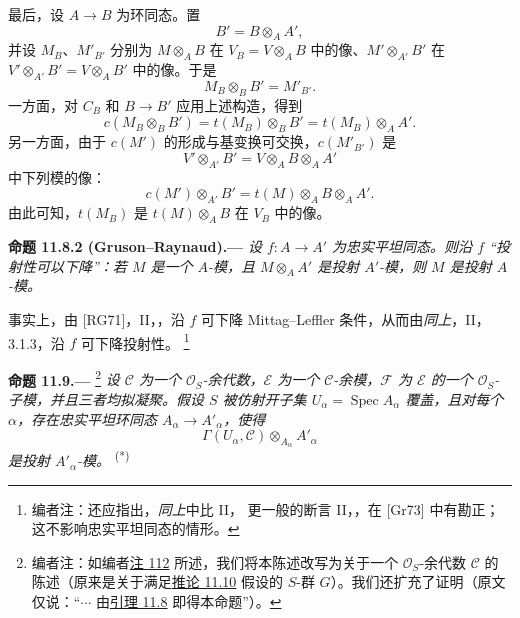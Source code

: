最后，设 \(A\to B\) 为环同态。置
\[
  B'=B\otimes_AA',
\]
并设 \(M_B\)、\(M'_{B'}\) 分别为 \(M\otimes_AB\) 在 \(V_B=V\otimes_AB\) 中的像、\(M'\otimes_{A'}B'\) 在 \(V'\otimes_{A'}B'=V\otimes_AB'\) 中的像。于是
\[
  M_B\otimes_BB'=M'_{B'}.
\]
一方面，对 \(C_B\) 和 \(B\to B'\) 应用上述构造，得到
\label{form:sga3-VIB-11.8.1-base-change-first}%
\[
  c(M_B\otimes_BB')
    =t(M_B)\otimes_BB'
    =t(M_B)\otimes_AA'.
\]
另一方面，由于 \(c(M')\) 的形成与基变换可交换，\(c(M'_{B'})\) 是
\[
  V'\otimes_{A'}B'=V\otimes_AB\otimes_AA'
\]
中下列模的像：
\label{form:sga3-VIB-11.8.1-base-change-second}%
\[
  c(M')\otimes_{A'}B'
    =t(M)\otimes_AB\otimes_AA'.
\]
由此可知，\(t(M_B)\) 是 \(t(M)\otimes_AB\) 在 \(V_B\) 中的像。

\medskip
{}\label{prop:sga3-VIB-11.8.2}%
\noindent\textbf{命题 11.8.2 \textup{(Gruson--Raynaud)}.---}
\emph{设 \(f:A\to A'\) 为忠实平坦同态。则沿 \(f\) ``投射性可以下降''：若 \(M\) 是一个 \(A\)-模，且 \(M\otimes_AA'\) 是投射 \(A'\)-模，则 \(M\) 是投射 \(A\)-模。}

事实上，由 \textup{[RG71]}，II，，沿 \(f\) 可下降 Mittag--Leffler 条件，从而由\emph{同上}，II，3.1.3，沿 \(f\) 可下降投射性。%
\footnote{\label{note:sga3-VIB-116}编者注：还应指出，\emph{同上}中比 II， 更一般的断言 II，，在 \textup{[Gr73]} 中有勘正；这不影响忠实平坦同态的情形。}

\medskip
{}\label{prop:sga3-VIB-11.9}%
\noindent\textbf{命题 11.9.---}%
\footnote{\label{note:sga3-VIB-117}编者注：如编者\hyperref[note:sga3-VIB-112]{注 112} 所述，我们将本陈述改写为关于一个 \(\mathcal O_S\)-余代数 \(\mathcal C\) 的陈述\textup{（原来是关于满足\hyperref[cor:sga3-VIB-11.10]{推论 11.10} 假设的 \(S\)-群 \(G\)）}。我们还扩充了证明\textup{（原文仅说：``\(\cdots\) 由\hyperref[lem:sga3-VIB-11.8]{引理 11.8} 即得本命题''）}。}
\emph{设 \(\mathcal C\) 为一个 \(\mathcal O_S\)-余代数，\(\mathcal E\) 为一个 \(\mathcal C\)-余模，\(\mathcal F\) 为 \(\mathcal E\) 的一个 \(\mathcal O_S\)-子模，并且三者均拟凝聚。假设 \(S\) 被仿射开子集 \(U_\alpha=\operatorname{Spec}A_\alpha\) 覆盖，且对每个 \(\alpha\)，存在忠实平坦环同态 \(A_\alpha\to A'_\alpha\)，使得}
\[
  \Gamma(U_\alpha,\mathcal C)\otimes_{A_\alpha}A'_\alpha
\]
\emph{是投射 \(A'_\alpha\)-模。}%
\textsuperscript{\textup{(*)}}
\begingroup
\renewcommand{\thefootnote}{*}%
\begin{NoHyper}
\end{NoHyper}
\endgroup

